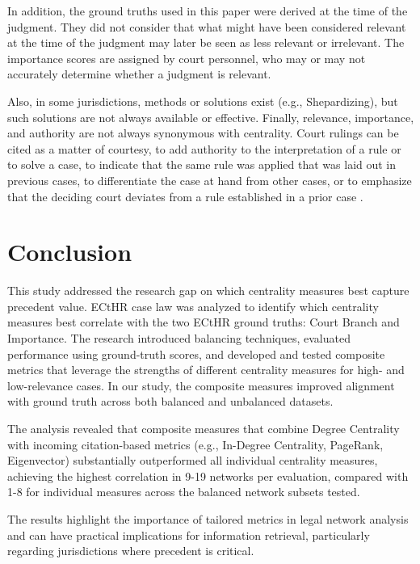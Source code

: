 \documentclass[sigconf]{acmart}
\begin{document}
In addition, the ground truths used in this paper were derived at the time of the judgment. They did not consider that what might have been considered relevant at the time of the judgment may later be seen as less relevant or irrelevant. The importance scores are assigned by court personnel, who may or may not accurately determine whether a judgment is relevant.

Also, in some jurisdictions, methods or solutions exist (e.g., Shepardizing), but such solutions are not always available or effective. Finally, relevance, importance, and authority are not always synonymous with centrality. Court rulings can be cited as a matter of courtesy, to add authority to the interpretation of a rule or to solve a case, to indicate that the same rule was applied that was laid out in previous cases, to differentiate the case at hand from other cases, or to emphasize that the deciding court deviates from a rule established in a prior case \cite{Derlen_etal_2014}\cite{vankuppevelt2020}\cite{Whalen2016}.


\section{Conclusion}

This study addressed the research gap on which centrality measures best capture precedent value. ECtHR case law was analyzed to identify which centrality measures best correlate with the two ECtHR ground truths: Court Branch and Importance.
The research introduced balancing techniques, evaluated performance using ground-truth scores, and developed and tested composite metrics that leverage the strengths of different centrality measures for high- and low-relevance cases. In our study, the composite measures improved alignment with ground truth across both balanced and unbalanced datasets.

The analysis revealed that composite measures that combine Degree Centrality with incoming citation-based metrics (e.g., In-Degree Centrality, PageRank, Eigenvector) substantially outperformed all individual centrality measures, achieving the highest correlation in 9-19 networks per evaluation, compared with 1-8 for individual measures across the balanced network subsets tested.

The results highlight the importance of tailored metrics in legal network analysis and can have practical implications for information retrieval, particularly regarding jurisdictions where precedent is critical.
\end{document}

